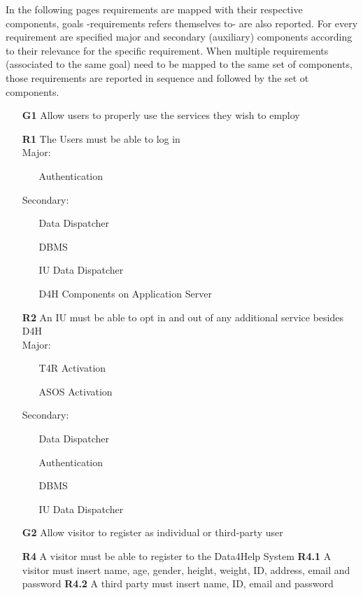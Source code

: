 In the following pages requirements are mapped with their respective components, goals -requirements refers themselves to- are also reported. For every requirement are specified major and secondary (auxiliary) components according to their relevance for the specific requirement.
When multiple requirements (associated to the same goal) need to be mapped to the same set of components, those requirements are reported in sequence and followed by the set ot components. \\

\begin{itemize}
\item [\textbf{G1}] Allow users to properly use the services they wish to employ 

\subitem \textbf{R1} The Users must be able to log in \\

Major:
\begin{itemize}
\item[\textbullet] Authentication  
\end{itemize}
Secondary:
\begin{itemize}
\item[\textbullet] Data Dispatcher
\item[\textbullet] DBMS
\item[\textbullet] IU Data Dispatcher
\item[\textbullet] D4H Components on Application Server
\end{itemize}
\subitem \textbf{R2} An IU must be able to opt in and out of any additional service besides D4H\\

Major:
\begin{itemize}
\item[\textbullet]T4R Activation
\item[\textbullet]ASOS Activation
\end{itemize}
Secondary:
\begin{itemize}
\item[\textbullet]Data Dispatcher 
\item[\textbullet]Authentication
\item[\textbullet]DBMS
\item[\textbullet]IU Data Dispatcher
\end{itemize}
\item [\textbf{G2}] Allow visitor to register as individual or third-party user 

\subitem \textbf{R4} A visitor must be able to register to the Data4Help System
\subitem \textbf{R4.1} A visitor must insert name, age, gender, height, weight, ID, address, email and password
\subitem \textbf{R4.2} A third party must insert name, ID, email and password\\


\end{itemize}
